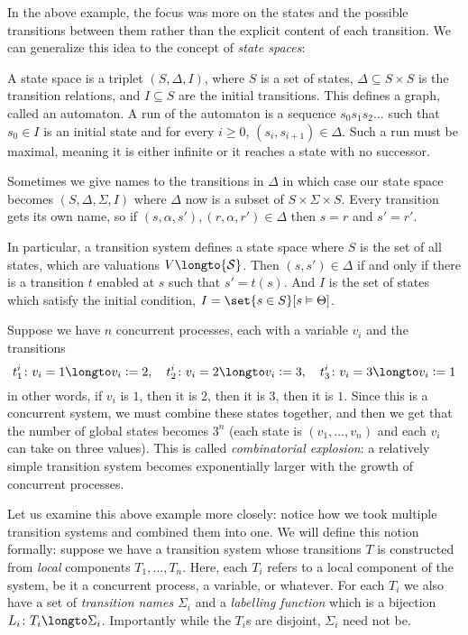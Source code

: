 \eexam

In the above example, the focus was more on the states and the possible transitions between them rather than the explicit content of each transition.
We can generalize this idea to the concept of {\it state spaces}:

\bdefn

    A {\emphcolor state space} is a triplet $(S,\Delta,I)$, where $S$ is a set of states, $\Delta\subseteq S\times S$ is the transition relations, and $I\subseteq S$ are the initial transitions.
    This defines a graph, called an {\emphcolor automaton}.
    A {\emphcolor run} of the automaton is a sequence $s_0s_1s_2\dots$ such that $s_0\in I$ is an initial state and for every $i\geq0$, $(s_i,s_{i+1})\in\Delta$.
    Such a run must be maximal, meaning it is either infinite or it reaches a state with no successor.

    Sometimes we give names to the transitions in $\Delta$ in which case our state space becomes $(S,\Delta,\Sigma,I)$ where $\Delta$ now is a subset of $S\times\Sigma\times S$.
    Every transition gets its own name, so if $(s,\alpha,s'),(r,\alpha,r')\in\Delta$ then $s=r$ and $s'=r'$.

\edefn

In particular, a transition system defines a state space where $S$ is the set of all states, which are valuations $V\longto{\cal S}$.
Then $(s,s')\in\Delta$ if and only if there is a transition $t$ enabled at $s$ such that $s'=t(s)$.
And $I$ is the set of states which satisfy the initial condition, $I=\set{s\in S}[s\vDash\Theta]$.

Suppose we have $n$ concurrent processes, each with a variable $v_i$ and the transitions
$$ t^i_1\colon v_i=1\longto v_i\coloneqq2,\quad t^i_2\colon v_i=2\longto v_i\coloneqq3,\quad t^i_3\colon v_i=3\longto v_i\coloneqq1 $$
in other words, if $v_i$ is $1$, then it is $2$, then it is $3$, then it is $1$.
Since this is a concurrent system, we must combine these states together, and then we get that the number of global states becomes $3^n$ (each state is $(v_1,\dots,v_n)$ and each $v_i$ can take on three
values).
This is called {\it combinatorial explosion}: a relatively simple transition system becomes exponentially larger with the growth of concurrent processes.

Let us examine this above example more closely: notice how we took multiple transition systems and combined them into one.
We will define this notion formally: suppose we have a transition system whose transitions $T$ is constructed from {\it local} components $T_1,\dots,T_n$.
Here, each $T_i$ refers to a local component of the system, be it a concurrent process, a variable, or whatever.
For each $T_i$ we also have a set of {\it transition names} $\Sigma_i$ and a {\it labelling function} which is a bijection $L_i\colon T_i\longto\Sigma_i$.
Importantly while the $T_i$s are disjoint, $\Sigma_i$ need not be.

